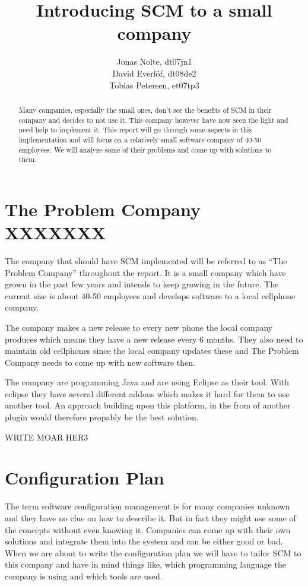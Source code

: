 \documentclass[a4paper,10pt]{article}
\title{Introducing SCM to a small company}
\author{Jonas Nolte, dt07jn1\\
David Everlöf, dt08de2\\
Tobias Petersen, et07tp3}
\begin{document}
\maketitle

\begin{abstract}

Many companies, especially the small ones, don't see the benefits of SCM in their company and decides to not use it.
This company however have now seen the light and need help to implement it.
This report will go through some aspects in this implementation and will focus on a relatively small software company of 40-50 employees.
We will analyze some of their problems and come up with solutions to them.


\end{abstract}

\section{The Problem Company XXXXXXX}

The company that should have SCM implemented will be referred to as “The Problem Company” throughout the report.
It is a small company which have grown in the past few years and intends to keep growing in the future. The current size is about 40-50 employees and develops software to a local cellphone company.

The company makes a new release to every new phone the local company produces which means they have a new release every 6 months.
They also need to maintain old cellphones since the local company updates these and The Problem Company needs to come up with new software then.

The company are programming Java and are using Eclipse as their tool.
With eclipse they have several different addons which makes it hard for them to use another tool. An approach building upon this platform, in the from of another plugin would therefore propably be the best solution.

WRITE MOAR HER3

\section{Configuration Plan}

The term software configuration management is for many companies unknown and they have no clue on how to describe it.
But in fact they might use some of the concepts without even knowing it.
Companies can come up with their own solutions and integrate them into the system and can be either good or bad. When we are about to write the configuration plan we will have to tailor SCM to this company and have in mind things like, which programming language the company is using and which tools are used.
\end{document}
